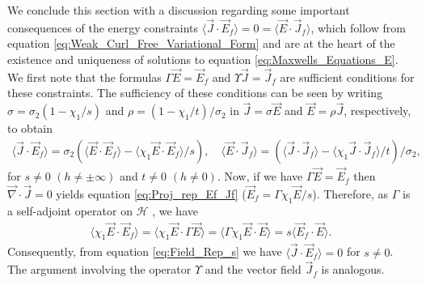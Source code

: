 \documentclass{cmslatex}
\begin{document}
We conclude this section with a discussion regarding some important
consequences of the energy constraints
$\langle\vec{J}\cdot\vec{E}_f\rangle=0=\langle\vec{E}\cdot\vec{J}_f\rangle$, which follow from
equation \eqref{eq:Weak_Curl_Free_Variational_Form} and are at the
heart of the existence and uniqueness of solutions to equation
\eqref{eq:Maxwells_Equations_E}. We first note that the formulas
$\Gamma\vec{E}=\vec{E}_f$ and $\Upsilon\vec{J}=\vec{J}_f$ are sufficient
conditions for these constraints. The sufficiency of these conditions
can be seen by writing $\sigma=\sigma_2(1-\chi_1/s)$ and $\rho=(1-\chi_1/t)/\sigma_2$ in
$\vec{J}=\sigma\vec{E}$ and $\vec{E}=\rho\vec{J}$, respectively, to obtain           
% 
\begin{align}\label{eq:Field_Rep_s}
  \langle\vec{J}\cdot\vec{E}_f\rangle=\sigma_2(\langle\vec{E}\cdot\vec{E}_f\rangle-\langle\chi_1\vec{E}\cdot\vec{E}_f\rangle/s),
 \quad
  \langle\vec{E}\cdot\vec{J}_f\rangle=(\langle\vec{J}\cdot\vec{J}_f\rangle-\langle\chi_1\vec{J}\cdot\vec{J}_f\rangle/t)/\sigma_2, 
\end{align}
%
for $s\neq0$ $(h\neq\pm\infty)$ and $t\neq0$ $(h\neq0)$. Now, if we have $\Gamma\vec{E}=\vec{E}_f$ then 
$\vec{\nabla}\cdot\vec{J}=0$ yields equation \eqref{eq:Proj_rep_Ef_Jf}
($\vec{E}_f=\Gamma\chi_1\vec{E}/s$). Therefore, as $\Gamma$ is a self-adjoint
operator on $\mathscr{H}$ \cite{Folland:95}, we have     
%
\begin{align}\label{eq:Suff_Cond}
  \langle\chi_1\vec{E}\cdot\vec{E}_f\rangle=\langle\chi_1\vec{E}\cdot\Gamma\vec{E}\rangle
                    =\langle\Gamma\chi_1\vec{E}\cdot\vec{E}\rangle
                    =s\langle\vec{E}_f\cdot\vec{E}\rangle.
\end{align}
%
Consequently, from equation \eqref{eq:Field_Rep_s}
we have $\langle\vec{J}\cdot\vec{E}_f\rangle=0$ for $s\neq0$. The argument involving the
operator $\Upsilon$ and the vector field $\vec{J}_f$ is analogous.
\end{document}
